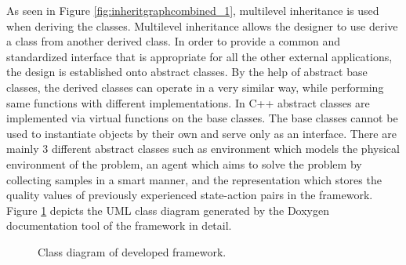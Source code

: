 \documentclass{ituphdreport}
\begin{document}
As seen in Figure \ref{fig:inheritgraphcombined_1}, multilevel inheritance is used when deriving the classes. Multilevel inheritance allows the designer to use derive a class from another derived class. In order to provide a common and standardized interface that is appropriate for all the other external applications, the design is established onto abstract classes. By the help of abstract base classes, the derived classes can operate in a very similar way, while performing same functions with different implementations. In C++ abstract classes are implemented via virtual functions on the base classes. The base classes cannot be used to instantiate objects by their own and serve only as an interface. There are mainly 3 different abstract classes such as environment which models the physical environment of the problem, an agent which aims to solve the problem by collecting samples in a smart manner, and the representation which stores the quality values of previously experienced state-action pairs in the framework. Figure \ref{fig:inheritgraphcombined} depicts the UML class diagram generated by the Doxygen documentation tool of the framework in detail.
\begin{figure}
	\begin{center}
	\end{center}
	\caption{Class diagram of developed framework.
		\label{fig:inheritgraphcombined}}
\end{figure}
\end{document}
